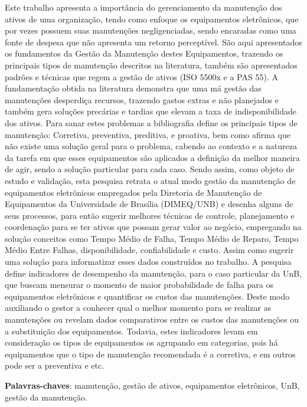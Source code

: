 \begin{resumo}
 
Este trabalho apresenta a importância do gerenciamento da manutenção dos ativos de uma organização, tendo como enfoque os equipamentos eletrônicos, que por vezes possuem suas manutenções negligenciadas, sendo encaradas como uma fonte de despesa que não apresenta um retorno perceptível. São aqui apresentados os fundamentos da Gestão da Manutenção destes Equipamentos, trazendo os principais tipos de manutenção descritos na literatura, também são apresentados padrões e técnicas que regem a gestão de ativos (ISO 5500x e a PAS 55). 
A fundamentação obtida na literatura demonstra que uma má gestão das manutenções desperdiça recursos, trazendo gastos extras e não planejados e também gera soluções precárias e tardias que elevam a taxa de indisponibilidade dos ativos. Para sanar estes problemas a bibliografia define os principais tipos de manutenção: Corretiva, preventiva, preditiva, e proativa, bem como afirma que não existe uma solução geral para o problema, cabendo ao contexto e a natureza da tarefa em que esses equipamentos são aplicados a definição da melhor maneira de agir, sendo a solução particular para cada caso. 
Sendo assim, como objeto de estudo e validação, esta pesquisa retrata o atual modo gestão da manutenção de equipamentos eletrônicos empregados pela Diretoria de Manutenção de Equipamentos da Universidade de Brasília (DIMEQ/UNB) e desenha alguns de seus processos, para então sugerir melhores técnicas de controle, planejamento e coordenação para se ter ativos que possam gerar valor ao negócio, empregando na solução conceitos como Tempo Médio de Falha, Tempo Médio de Reparo, Tempo Médio Entre Falhas, disponibilidade, confiabilidade e custo. Assim como sugerir uma solução para informatizar esses dados construídos no trabalho.
A pesquisa define indicadores de desempenho da manutenção, para o caso particular da UnB, que buscam mensurar o momento de maior probabilidade de falha para os equipamentos eletrônicos e quantificar os custos das manutenções. Deste modo auxiliando o gestor a conhecer qual o melhor momento para se realizar as manutenções ou revelam dados comparativos entre os custos das manutenções ou a substituição dos equipamentos. Todavia, estes indicadores levam em consideração os tipos de equipamentos os agrupando em categorias, pois há equipamentos que o tipo de manutenção recomendada é a corretiva, e em outros pode ser a preventiva e etc.


 \vspace{\onelineskip}
    
 \noindent
 \textbf{Palavras-chaves}: manutenção, gestão de ativos, equipamentos eletrônicos, UnB, gestão da manutenção.
\end{resumo}
